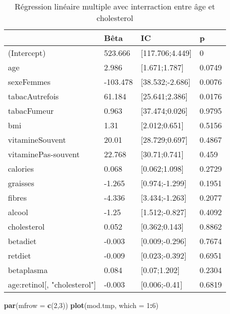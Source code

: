 \documentclass[]{article}
\newenvironment{Shaded}{\begin{snugshade}}{\end{snugshade}}
\newcommand{\KeywordTok}[1]{\textcolor[rgb]{0.13,0.29,0.53}{\textbf{#1}}}
\newcommand{\DataTypeTok}[1]{\textcolor[rgb]{0.13,0.29,0.53}{#1}}
\newcommand{\DecValTok}[1]{\textcolor[rgb]{0.00,0.00,0.81}{#1}}
\newcommand{\OperatorTok}[1]{\textcolor[rgb]{0.81,0.36,0.00}{\textbf{#1}}}
\newcommand{\NormalTok}[1]{#1}
\begin{document}
\begin{table}

\caption{\label{tab:unnamed-chunk-56}Régression linéaire multiple avec interraction entre âge et cholesterol}
\centering
\begin{tabular}[t]{l|l|l|l}
\hline
  & Bêta & IC & p\\
\hline
\rowcolor[HTML]{BBD2E1}  (Intercept) & 523.666 & [117.706;4.449] & 0\\
\hline
age & 2.986 & [1.671;1.787] & 0.0749\\
\hline
\rowcolor[HTML]{BBD2E1}  sexeFemmes & -103.478 & [38.532;-2.686] & 0.0076\\
\hline
tabacAutrefois & 61.184 & [25.641;2.386] & 0.0176\\
\hline
\rowcolor[HTML]{BBD2E1}  tabacFumeur & 0.963 & [37.474;0.026] & 0.9795\\
\hline
bmi & 1.31 & [2.012;0.651] & 0.5156\\
\hline
\rowcolor[HTML]{BBD2E1}  vitamineSouvent & 20.01 & [28.729;0.697] & 0.4867\\
\hline
vitaminePas-souvent & 22.768 & [30.71;0.741] & 0.459\\
\hline
\rowcolor[HTML]{BBD2E1}  calories & 0.068 & [0.062;1.098] & 0.2729\\
\hline
graisses & -1.265 & [0.974;-1.299] & 0.1951\\
\hline
\rowcolor[HTML]{BBD2E1}  fibres & -4.336 & [3.434;-1.263] & 0.2077\\
\hline
alcool & -1.25 & [1.512;-0.827] & 0.4092\\
\hline
\rowcolor[HTML]{BBD2E1}  cholesterol & 0.052 & [0.362;0.143] & 0.8862\\
\hline
betadiet & -0.003 & [0.009;-0.296] & 0.7674\\
\hline
\rowcolor[HTML]{BBD2E1}  retdiet & -0.009 & [0.023;-0.392] & 0.6951\\
\hline
betaplasma & 0.084 & [0.07;1.202] & 0.2304\\
\hline
\rowcolor[HTML]{BBD2E1}  age:retinol[, "cholesterol"] & -0.003 & [0.006;-0.41] & 0.6819\\
\hline
\end{tabular}
\end{table}

\begin{Shaded}
\begin{Highlighting}[]
\KeywordTok{par}\NormalTok{(}\DataTypeTok{mfrow =} \KeywordTok{c}\NormalTok{(}\DecValTok{2}\NormalTok{,}\DecValTok{3}\NormalTok{))}
\KeywordTok{plot}\NormalTok{(mod.tmp, }\DataTypeTok{which =} \DecValTok{1}\OperatorTok{:}\DecValTok{6}\NormalTok{)}
\end{Highlighting}
\end{Shaded}
\end{document}
